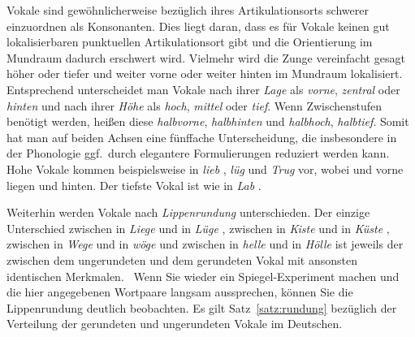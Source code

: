 Vokale sind gewöhnlicherweise bezüglich ihres Artikulationsorts schwerer einzuordnen als Konsonanten.
Dies liegt daran, dass es für Vokale keinen gut lokalisierbaren punktuellen Artikulationsort gibt und die Orientierung im Mundraum dadurch erschwert wird.
Vielmehr wird die Zunge vereinfacht gesagt höher oder tiefer und weiter vorne oder weiter hinten im Mundraum lokalisiert.
Entsprechend unterscheidet man Vokale nach ihrer \textit{Lage} als \textit{vorne}, \textit{zentral} oder \textit{hinten} und nach ihrer \textit{Höhe} als \textit{hoch}, \textit{mittel} oder \textit{tief}.
Wenn Zwischenstufen benötigt werden, heißen diese \textit{halbvorne}, \textit{halbhinten} und \textit{halbhoch}, \textit{halbtief}.
Somit hat man auf beiden Achsen eine fünffache Unterscheidung, die insbesondere in der Phonologie ggf.\ durch elegantere Formulierungen reduziert werden kann.
Hohe Vokale kommen beispielsweise in \textit{lieb} \textipa{[li:p]}, \textit{lüg} \textipa{[ly:k]} und \textit{Trug} \textipa{[tKu:k]} vor, wobei \textipa{[i]} und \textipa{[y]} vorne liegen und \textipa{[u]} hinten.
Der tiefste Vokal ist \textipa{[a]} wie in \textit{Lab} \textipa{[la:p]}.

Weiterhin werden Vokale nach \textit{Lippenrundung} unterschieden.
Der einzige Unterschied
zwischen \textipa{[i]} in \textit{Liege} \textipa{[li:g@]} und \textipa{[y]} in \textit{Lüge} \textipa{[ly:g@]},
zwischen \textipa{[I]} in \textit{Kiste} \textipa{[kIst@]} und \textipa{[Y]} in \textit{Küste} \textipa{[kYst@]},
zwischen \textipa{[e]} in \textit{Wege} \textipa{[ve:g@]} und \textipa{[\o]} in \textit{wöge} \textipa{[v\o:g@]}
und zwischen \textipa{[E]} in \textit{helle} \textipa{[hEl@]} und \textipa{[\oe]} in \textit{Hölle} \textipa{[h{\oe}l@]}
ist jeweils der zwischen dem ungerundeten und dem gerundeten Vokal mit ansonsten identischen Merkmalen.
\TuBegin~Wenn Sie wieder ein Spiegel-Experiment machen und die hier angegebenen Wortpaare langsam aussprechen, können Sie die Lippenrundung deutlich beobachten.
Es gilt Satz~\ref{satz:rundung} bezüglich der Verteilung der gerundeten und ungerundeten Vokale im Deutschen.

\Np


